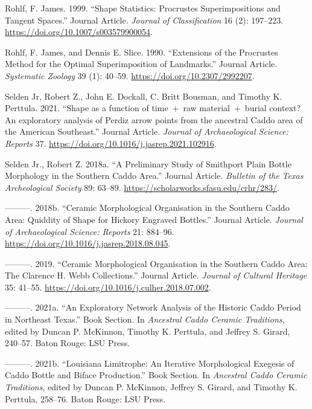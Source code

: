 \documentclass[smallextended]{svjour3}       %
\newlength{\cslhangindent}
\newlength{\cslentryspacingunit} %
\newenvironment{CSLReferences}[2] %
 {%
  \setlength{\parindent}{0pt}
  \ifodd #1
  \let\oldpar\par
  \def\par{\hangindent=\cslhangindent\oldpar}
  \fi
  \setlength{\parskip}{#2\cslentryspacingunit}
 }%
 {}
\begin{document}
\begin{CSLReferences}{1}{0}
\leavevmode{}%
Rohlf, F. James. 1999. {``{Shape Statistics: Procrustes Superimpositions
and Tangent Spaces}.''} Journal Article. \emph{Journal of
Classification} 16 (2): 197--223.
\url{https://doi.org/10.1007/s003579900054}.

\leavevmode{}%
Rohlf, F. James, and Dennis E. Slice. 1990. {``{Extensions of the
Procrustes Method for the Optimal Superimposition of Landmarks}.''}
Journal Article. \emph{Systematic Zoology} 39 (1): 40--59.
\url{https://doi.org/10.2307/2992207}.

\leavevmode{}%
Selden Jr, Robert Z., John E. Dockall, C. Britt Bousman, and Timothy K.
Perttula. 2021. {``{Shape as a function of time~+~raw material~+~burial
context? An exploratory analysis of Perdiz arrow points from the
ancestral Caddo area of the American Southeast}.''} Journal Article.
\emph{Journal of Archaeological Science: Reports} 37.
\url{https://doi.org/10.1016/j.jasrep.2021.102916}.

\leavevmode{}%
Selden Jr., Robert Z. 2018a. {``{A Preliminary Study of Smithport Plain
Bottle Morphology in the Southern Caddo Area}.''} Journal Article.
\emph{Bulletin of the Texas Archeological Society} 89: 63--89.
\url{https://scholarworks.sfasu.edu/crhr/283/}.

\leavevmode{}%
---------. 2018b. {``{Ceramic Morphological Organisation in the Southern
Caddo Area: Quiddity of Shape for Hickory Engraved Bottles}.''} Journal
Article. \emph{Journal of Archaeological Science: Reports} 21: 884--96.
\url{https://doi.org/10.1016/j.jasrep.2018.08.045}.

\leavevmode{}%
---------. 2019. {``{Ceramic Morphological Organisation in the Southern
Caddo Area: The Clarence H. Webb Collections}.''} Journal Article.
\emph{Journal of Cultural Heritage} 35: 41--55.
\url{https://doi.org/10.1016/j.culher.2018.07.002}.

\leavevmode{}%
---------. 2021a. {``{An Exploratory Network Analysis of the Historic
Caddo Period in Northeast Texas}.''} Book Section. In \emph{Ancestral
Caddo Ceramic Traditions}, edited by Duncan P. McKinnon, Timothy K.
Perttula, and Jeffrey S. Girard, 240--57. Baton Rouge: LSU Press.

\leavevmode{}%
---------. 2021b. {``{Louisiana Limitrophe: An Iterative Morphological
Exegesis of Caddo Bottle and Biface Production}.''} Book Section. In
\emph{Ancestral Caddo Ceramic Traditions}, edited by Duncan P. McKinnon,
Jeffrey S. Girard, and Timothy K. Perttula, 258--76. Baton Rouge: LSU
Press.


\end{CSLReferences}
\end{document}
